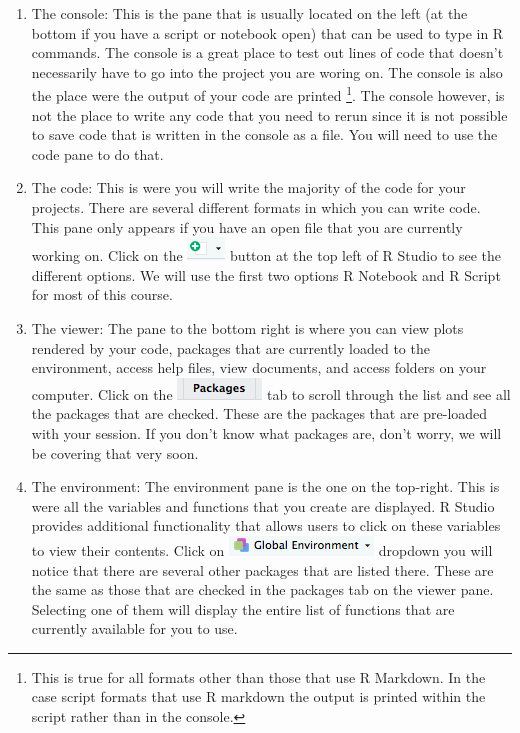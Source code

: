 \documentclass[]{article}
\providecommand{\tightlist}{%
  \setlength{\itemsep}{0pt}\setlength{\parskip}{0pt}}
\let\rmarkdownfootnote\footnote%
\def\footnote{\protect\rmarkdownfootnote}
\begin{document}
\begin{enumerate}
\def\labelenumi{\arabic{enumi}.}
\tightlist
\item
  The console: This is the pane that is usually located on the left (at
  the bottom if you have a script or notebook open) that can be used to
  type in R commands. The console is a great place to test out lines of
  code that doesn't necessarily have to go into the project you are
  woring on. The console is also the place were the output of your code
  are printed \footnote{This is true for all formats other than those
    that use R Markdown. In the case script formats that use R markdown
    the output is printed within the script rather than in the console.}.
  The console however, is not the place to write any code that you need
  to rerun since it is not possible to save code that is written in the
  console as a file. You will need to use the code pane to do that.
\item
  The code: This is were you will write the majority of the code for
  your projects. There are several different formats in which you can
  write code. This pane only appears if you have an open file that you
  are currently working on. Click on the
  \includegraphics{assets/scripts.png} button at the top left of R
  Studio to see the different options. We will use the first two options
  R Notebook and R Script for most of this course.
\item
  The viewer: The pane to the bottom right is where you can view plots
  rendered by your code, packages that are currently loaded to the
  environment, access help files, view documents, and access folders on
  your computer. Click on the \includegraphics{assets/packages.png} tab
  to scroll through the list and see all the packages that are checked.
  These are the packages that are pre-loaded with your session. If you
  don't know what packages are, don't worry, we will be covering that
  very soon.
\item
  The environment: The environment pane is the one on the top-right.
  This is were all the variables and functions that you create are
  displayed. R Studio provides additional functionality that allows
  users to click on these variables to view their contents. Click on
  \includegraphics{assets/global environ.png} dropdown you will notice
  that there are several other packages that are listed there. These are
  the same as those that are checked in the packages tab on the viewer
  pane. Selecting one of them will display the entire list of functions
  that are currently available for you to use.
\end{enumerate}
\end{document}
